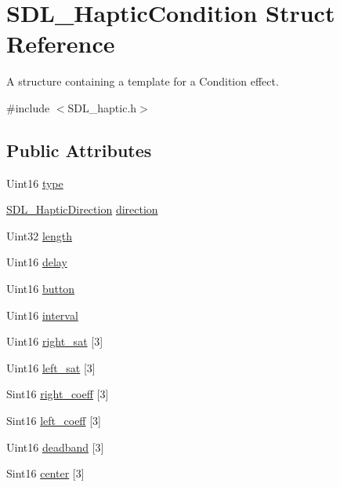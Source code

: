 \hypertarget{structSDL__HapticCondition}{\section{S\+D\+L\+\_\+\+Haptic\+Condition Struct Reference}
\label{structSDL__HapticCondition}
}


A structure containing a template for a Condition effect.  




{\ttfamily \#include $<$S\+D\+L\+\_\+haptic.\+h$>$}

\subsection*{Public Attributes}
\begin{DoxyCompactItemize}
\item 
Uint16 \hyperlink{structSDL__HapticCondition_a7be55a9a86c05dd1a54a3006781cfa6f}{type}
\item 
\hyperlink{structSDL__HapticDirection}{S\+D\+L\+\_\+\+Haptic\+Direction} \hyperlink{structSDL__HapticCondition_a728507d30d18998949313de3a25e5581}{direction}
\item 
Uint32 \hyperlink{structSDL__HapticCondition_ad0efb0a6ddc20f058e87199eaaa95978}{length}
\item 
Uint16 \hyperlink{structSDL__HapticCondition_aad40417980530ca8d80c62ba864a090b}{delay}
\item 
Uint16 \hyperlink{structSDL__HapticCondition_acd35a9d432ad122bf7824b16974eac7a}{button}
\item 
Uint16 \hyperlink{structSDL__HapticCondition_aafc182abea1078bed7e9cf5d0e713ea2}{interval}
\item 
Uint16 \hyperlink{structSDL__HapticCondition_ae60f900dda3063e1b63be77b154148b7}{right\+\_\+sat} \mbox{[}3\mbox{]}
\item 
Uint16 \hyperlink{structSDL__HapticCondition_a9b7f297ab398efd2a9b9cb68eaab0834}{left\+\_\+sat} \mbox{[}3\mbox{]}
\item 
Sint16 \hyperlink{structSDL__HapticCondition_a8fd18ffa42b1a34a28759657eac21e45}{right\+\_\+coeff} \mbox{[}3\mbox{]}
\item 
Sint16 \hyperlink{structSDL__HapticCondition_ad0cb577a8aaf26d4cfcd857b7a6c44db}{left\+\_\+coeff} \mbox{[}3\mbox{]}
\item 
Uint16 \hyperlink{structSDL__HapticCondition_a7b343c95c46a3dd44ead46b169bc3f6f}{deadband} \mbox{[}3\mbox{]}
\item 
Sint16 \hyperlink{structSDL__HapticCondition_ad29db17143c5666e302c77e8e1b40ca0}{center} \mbox{[}3\mbox{]}
\end{DoxyCompactItemize}


